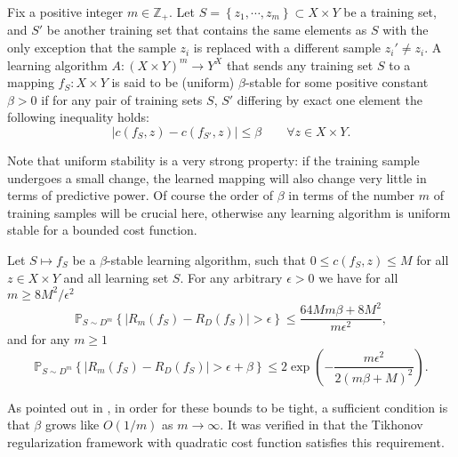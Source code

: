 \documentclass[letterpaper]{article} %
\begin{document}
\begin{definition}
  \label{defn:uniform-stability}
  Fix a positive integer $m\in\mathbb{Z}_+$. Let $S=\left\{ z_1,\cdots,z_m \right\}\subset X\times Y$ be a training set, and $S'$ be another training set that contains the same elements as $S$ with the only exception that the sample $z_i$ is replaced with a different sample $z_i'\neq z_i$. A learning algorithm $A:\left( X\times Y \right)^m\rightarrow Y^X$ that sends any training set $S$ to a mapping $f_S:X\times Y$ is said to be (uniform) $\beta$-stable for some positive constant $\beta>0$ if for any pair of training sets $S$, $S'$ differing by exact one element the following inequality holds:
  \begin{equation*}
    \left| c \left( f_S,z \right)-c\left(f_{S'},z\right) \right|\leq \beta\qquad\forall z\in X\times Y.
  \end{equation*}
\end{definition}
Note that uniform stability is a very strong property: if the training sample undergoes a small change, the learned mapping will also change very little in terms of predictive power. Of course the order of $\beta$ in terms of the number $m$ of training samples will be crucial here, otherwise any learning algorithm is uniform stable for a bounded cost function.

\begin{theorem}
  \label{thm:bousquet-elisseeff}
  Let $S\mapsto f_S$ be a $\beta$-stable learning algorithm, such that $0\leq c \left( f_S,z \right)\leq M$ for all $z\in X\times Y$ and all learning set $S$. For any arbitrary $\epsilon>0$ we have for all $m\geq 8M^2/\epsilon^2$
  \begin{equation}
    \label{eq:fraction-bounds}
    \mathbb{P}_{S\sim D^m} \left\{ \left| R_m \left( f_S \right)-R_D \left( f_S \right) \right| > \epsilon\right\}\leq \frac{64 Mm\beta+8M^2}{m\epsilon^2},
  \end{equation}
  and for any $m\geq 1$
  \begin{equation}
    \label{eq:exponential-bounds}
    \mathbb{P}_{S\sim D^m} \left\{ \left| R_m \left( f_S \right)-R_D \left( f_S \right) \right| > \epsilon+\beta\right\}\leq 2\exp \left( -\frac{m\epsilon^2}{2 \left( m\beta+M \right)^2} \right).
  \end{equation}
\end{theorem}
As pointed out in \cite{Algorithmic_Stability}, in order for these bounds to be tight, a sufficient condition is that $\beta$ grows like $O \left( 1/m \right)$ as $m\rightarrow\infty$. It was verified in \cite{Algorithmic_Stability} that the Tikhonov regularization framework with quadratic cost function satisfies this requirement.
\end{document}
